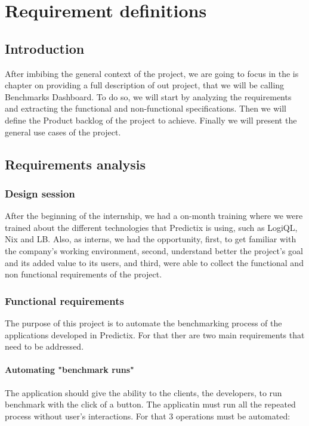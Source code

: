 \chapter{Requirement definitions}

\section*{Introduction}

After imbibing the general context of the project, we are going to focus in
the is chapter on providing a full description of out project, that we will be
calling Benchmarks Dashboard. To do so, we will start by analyzing the
requirements and extracting the  functional and non-functional specifications.
Then we will define the Product backlog of the project to achieve. Finally we
will present the general use cases of the project.

\pagebreak

\section{Requirements analysis}

\subsection{Design session}
After  the beginning of the internship, we had a on-month training where we were
trained about the different technologies that Predictix is using, such as
LogiQL, Nix and LB. Also, as interns, we had the opportunity, first, to get
familiar with the company's working environment, second, understand better the
project's goal and its added value to its users, and third, were able to collect
the functional and non functional requirements of the project.


\subsection{Functional requirements}
The  purpose of this project is to automate the benchmarking process of the
applications developed in Predictix. For that ther are two main requirements
that need to be addressed.

\subsubsection{Automating "benchmark runs"}
The application should give the ability to the clients, the developers, to run
benchmark with the click of a button. The applicatin must run all the repeated
process without user's interactions. For that 3 operations must be automated:

